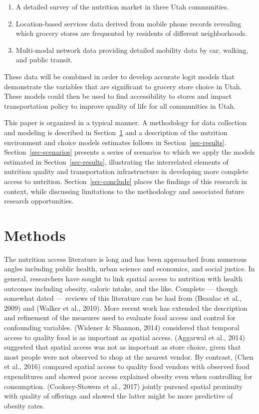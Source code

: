 \documentclass[
  letterpaper,
  number,
  review,
  doubleblind,
  3p]{elsarticle}
\providecommand{\tightlist}{%
  \setlength{\itemsep}{0pt}\setlength{\parskip}{0pt}}\usepackage{longtable,booktabs,array}
\begin{document}
\begin{enumerate}
\def\labelenumi{\arabic{enumi}.}
\tightlist
\item
  A detailed survey of the nutrition market in three Utah communities.
\item
  Location-based services data derived from mobile phone records
  revealing which grocery stores are frequented by residents of
  different neighborhoods.
\item
  Multi-modal network data providing detailed mobility data by car,
  walking, and public transit.
\end{enumerate}

These data will be combined in order to develop accurate logit models
that demonstrate the variables that are significant to grocery store
choice in Utah. These models could then be used to find accessibility to
stores and impact transportation policy to improve quality of life for
all communities in Utah.

This paper is organized in a typical manner. A methodology for data
collection and modeling is described in Section~\ref{sec-methods} and a
description of the nutrition environment and choice models estimates
follows in Section~\ref{sec-results}. Section~\ref{sec-scenarios}
presents a series of scenarios to which we apply the models estimated in
Section~\ref{sec-results}, illustrating the interrelated elements of
nutrition quality and transportation infrastructure in developing more
complete access to nutrition. Section~\ref{sec-conclude} places the
findings of this research in context, while discussing limitations to
the methodology and associated future research opportunities.


\section{Methods}\label{sec-methods}

The nutrition access literature is long and has been approached from
numerous angles including public health, urban science and economics,
and social justice. In general, researchers have sought to link spatial
access to nutrition with health outcomes including obesity, caloric
intake, and the like. Complete --- though somewhat dated --- reviews of
this literature can be had from (Beaulac et al., 2009) and (Walker et
al., 2010). More recent work has extended the description and refinement
of the measures used to evaluate food access and control for confounding
variables. (Widener \& Shannon, 2014) considered that temporal access to
quality food is as important as spatial access. (Aggarwal et al., 2014)
suggested that spatial access was not as important as store choice,
given that most people were not observed to shop at the nearest vendor.
By contrast, (Chen et al., 2016) compared spatial access to quality food
vendors with observed food expenditures and showed poor access explained
obesity even when controlling for consumption. (Cooksey-Stowers et al.,
2017) jointly pursued spatial proximity with quality of offerings and
showed the latter might be more predictive of obesity rates.
\end{document}
